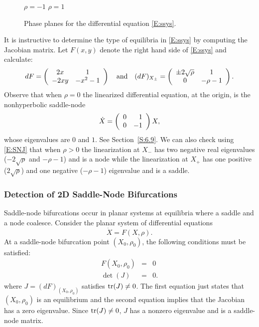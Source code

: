 \documentclass{ximera}
\begin{document}
\begin{figure}[htb]
           \centerline{%
	   }
		\vspace*{-0.2in}		
		\hspace{1.3in} $\rho=-1$ \hspace{2.1in} $\rho=1$
   \caption{Phase planes for the differential equation \protect\eqref{E:ssys}.}
           \label{F:ssys}
\end{figure}

It is instructive to determine the type of equilibria in \eqref{E:ssys} by
computing the Jacobian matrix.  Let $F(x,y)$ denote the right hand side of 
\eqref{E:ssys} and calculate:
\begin{equation}  \label{E:SNJ}
dF = \left(\begin{array}{cc} 2x & 1\\ -2xy &-x^2-1\end{array}\right) \quad\mbox{and}\quad 
(dF)_{X_{\pm}}= \left(\begin{array}{cc} \pm 2\sqrt{\rho} & 1\\ 0 &-\rho-1\end{array}\right).
\end{equation}
Observe that when $\rho=0$ the linearized differential equation, at the origin, 
is the nonhyperbolic saddle-node
\[
\dot{X} = \left(\begin{array}{rr} 0 & 1\\ 0 &-1\end{array}\right)X,
\]
whose eigenvalues are $0$ and $1$.  See Section~\ref{S:6.9}. We can also check
using \eqref{E:SNJ} that when $\rho>0$ the linearization at $X_{-}$ has two 
negative real eigenvalues ($-2\sqrt{\rho}$ and $-\rho-1$)  and is a node 
while the linearization at $X_{+}$ has one positive ($2\sqrt{\rho}$) and one 
negative ($-\rho-1$) eigenvalue and is a saddle.


\subsubsection*{Detection of 2D Saddle-Node Bifurcations}

Saddle-node bifurcations occur in planar systems at equilibria  where a 
saddle and a node coalesce.  Consider the planar system of differential 
equations
\[
\dot{X} = F(X,\rho).
\]
At a saddle-node bifurcation point $(X_0,\rho_0)$, the following conditions
must be satisfied:
\begin{equation}  \label{E:DCSN2}
\begin{array}{rcl}
F(X_0,\rho_0) & = & 0\\
\det(J) & = & 0.
\end{array}
\end{equation}
where $J = (dF)_{(X_0,\rho_0)}$ satisfies ${\rm tr}(J)\neq 0$.  The first 
equation just states that $(X_0,\rho_0)$ is an equilibrium and the second 
equation implies that the Jacobian has a zero eigenvalue.  Since 
${\rm tr}(J)\neq 0$, $J$ has a nonzero eigenvalue and is a saddle-node matrix.
\end{document}
